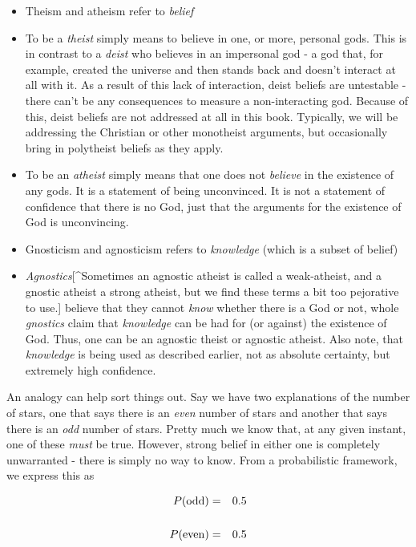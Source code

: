 \documentclass{tufte-book}
\begin{document}
\begin{itemize}
\itemsep1pt\parskip0pt
\item
  Theism and atheism refer to \emph{belief}
\item
  To be a \emph{theist} simply means to believe in one, or more,
  personal gods. This is in contrast to a \emph{deist} who believes in
  an impersonal god - a god that, for example, created the universe and
  then stands back and doesn't interact at all with it. As a result of
  this lack of interaction, deist beliefs are untestable - there can't
  be any consequences to measure a non-interacting god. Because of this,
  deist beliefs are not addressed at all in this book. Typically, we
  will be addressing the Christian or other monotheist arguments, but
  occasionally bring in polytheist beliefs as they apply.
\item
  To be an \emph{atheist} simply means that one does not \emph{believe}
  in the existence of any gods. It is a statement of being unconvinced.
  It is not a statement of confidence that there is no God, just that
  the arguments for the existence of God is unconvincing.
\item
  Gnosticism and agnosticism refers to \emph{knowledge} (which is a
  subset of belief)
\item
  \emph{Agnostics}{[}\^{}Sometimes an agnostic atheist is called a
  weak-atheist, and a gnostic atheist a strong atheist, but we find
  these terms a bit too pejorative to use.{]} believe that they cannot
  \emph{know} whether there is a God or not, whole \emph{gnostics} claim
  that \emph{knowledge} can be had for (or against) the existence of
  God. Thus, one can be an agnostic theist or agnostic atheist. Also
  note, that \emph{knowledge} is being used as described earlier, not as
  absolute certainty, but extremely high confidence.
\end{itemize}

An analogy can help sort things out. Say we have two explanations of the
number of stars, one that says there is an \emph{even} number of stars
and another that says there is an \emph{odd} number of stars. Pretty
much we know that, at any given instant, one of these \emph{must} be
true. However, strong belief in either one is completely unwarranted -
there is simply no way to know. From a probabilistic framework, we
express this as

\begin{eqnarray*}
P({\rm odd}) &=&0.5 \\\\
P({\rm even})&=&0.5
\end{eqnarray*}
\end{document}

